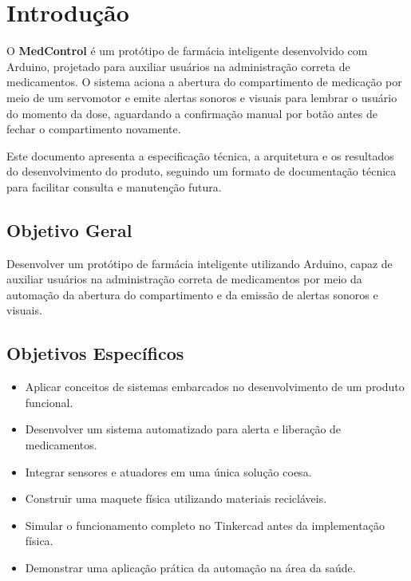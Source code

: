 \documentclass[11pt,a4paper]{article}
\begin{document}
\section{Introdução}

O \textbf{MedControl} é um protótipo de farmácia inteligente desenvolvido com Arduino, projetado para auxiliar usuários na administração correta de medicamentos. O sistema aciona a abertura do compartimento de medicação por meio de um servomotor e emite alertas sonoros e visuais para lembrar o usuário do momento da dose, aguardando a confirmação manual por botão antes de fechar o compartimento novamente.

Este documento apresenta a especificação técnica, a arquitetura e os resultados do desenvolvimento do produto, seguindo um formato de documentação técnica para facilitar consulta e manutenção futura.

\subsection{Objetivo Geral}

\begin{infobox}
Desenvolver um protótipo de farmácia inteligente utilizando Arduino, capaz de auxiliar usuários na administração correta de medicamentos por meio da automação da abertura do compartimento e da emissão de alertas sonoros e visuais.
\end{infobox}

\subsection{Objetivos Específicos}

\begin{itemize}[leftmargin=1.4em, itemsep=2pt]
  \item Aplicar conceitos de sistemas embarcados no desenvolvimento de um produto funcional.
  \item Desenvolver um sistema automatizado para alerta e liberação de medicamentos.
  \item Integrar sensores e atuadores em uma única solução coesa.
  \item Construir uma maquete física utilizando materiais recicláveis.
  \item Simular o funcionamento completo no Tinkercad antes da implementação física.
  \item Demonstrar uma aplicação prática da automação na área da saúde.
\end{itemize}
\end{document}
